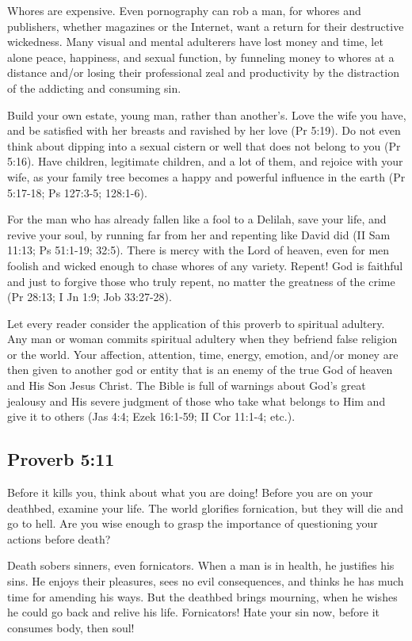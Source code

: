 Whores are expensive. Even pornography can rob a man, for whores and publishers, whether magazines or the Internet, want a return for their destructive wickedness. Many visual and mental adulterers have lost money and time, let alone peace, happiness, and sexual function, by funneling money to whores at a distance and/or losing their professional zeal and productivity by the distraction of the addicting and consuming sin.

Build your own estate, young man, rather than another’s. Love the wife you have, and be satisfied with her breasts and ravished by her love (Pr 5:19). Do not even think about dipping into a sexual cistern or well that does not belong to you (Pr 5:16). Have children, legitimate children, and a lot of them, and rejoice with your wife, as your family tree becomes a happy and powerful influence in the earth (Pr 5:17-18; Ps 127:3-5; 128:1-6).

For the man who has already fallen like a fool to a Delilah, save your life, and revive your soul, by running far from her and repenting like David did (II Sam 11:13; Ps 51:1-19; 32:5). There is mercy with the Lord of heaven, even for men foolish and wicked enough to chase whores of any variety. Repent! God is faithful and just to forgive those who truly repent, no matter the greatness of the crime (Pr 28:13; I Jn 1:9; Job 33:27-28).

Let every reader consider the application of this proverb to spiritual adultery. Any man or woman commits spiritual adultery when they befriend false religion or the world. Your affection, attention, time, energy, emotion, and/or money are then given to another god or entity that is an enemy of the true God of heaven and His Son Jesus Christ. The Bible is full of warnings about God’s great jealousy and His severe judgment of those who take what belongs to Him and give it to others (Jas 4:4; Ezek 16:1-59; II Cor 11:1-4; etc.).

\subsection{Proverb 5:11}
Before it kills you, think about what you are doing! Before you are on your deathbed, examine your life. The world glorifies fornication, but they will die and go to hell. Are you wise enough to grasp the importance of questioning your actions before death?

Death sobers sinners, even fornicators. When a man is in health, he justifies his sins. He enjoys their pleasures, sees no evil consequences, and thinks he has much time for amending his ways. But the deathbed brings mourning, when he wishes he could go back and relive his life. Fornicators! Hate your sin now, before it consumes body, then soul!

